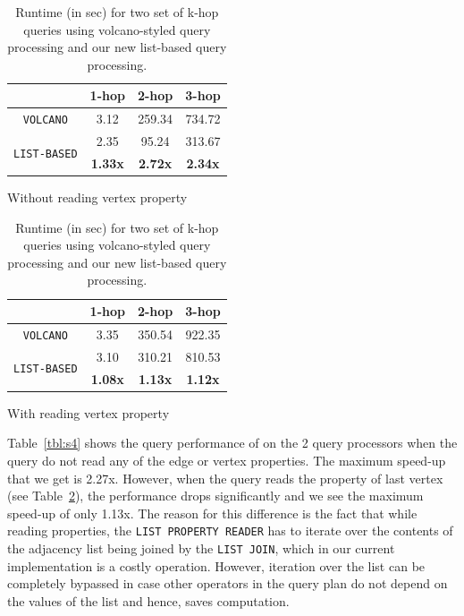\begin{table}
	\centering
	\begin{subtable}{1\textwidth}
		\centering
		\bgroup
		\setlength{\tabcolsep}{8pt}
		\def\arraystretch{1.2}%
		\begin{tabular}{ |c|c|c|c| }
			\hline
			& \textbf{1-hop} & \textbf{2-hop} & \textbf{3-hop} \\ 
			\hline \hline
			\texttt{VOLCANO}& 3.12 & 259.34 & 734.72 \\ 
			\hline
			\multirow{2}{*}{\texttt{LIST-BASED}}& 2.35 & 95.24 & 313.67 \\ 
			& \textbf{1.33x} & \textbf{2.72x} & \textbf{2.34x} \\ 
			\hline
		\end{tabular}
		\egroup
		\captionsetup{justification=centering}
		\caption{Without reading vertex property}
		\label{tbl:s4}
	\end{subtable}
	\begin{subtable}{1\textwidth}
		\centering
		\bgroup
		\setlength{\tabcolsep}{8pt}
		\def\arraystretch{1.2}
		\begin{tabular}{ |c|c|c|c| }
			\hline
			& \textbf{1-hop} & \textbf{2-hop} & \textbf{3-hop} \\ 
			\hline \hline
			\texttt{VOLCANO}& 3.35 & 350.54 & 922.35 \\ 
			\hline
			\multirow{2}{*}{\texttt{LIST-BASED}}& 3.10 & 310.21 & 810.53 \\ 
			& \textbf{1.08x} & \textbf{1.13x} & \textbf{1.12x} \\ 
			\hline
		\end{tabular}
		\egroup
		\captionsetup{justification=centering}
		\caption{With reading vertex property}
		\label{tbl:s5}
	\end{subtable}
	\captionsetup{justification=centering}
	\caption{Runtime (in sec) for two set of k-hop queries using volcano-styled query processing and our new list-based query processing.  }
\end{table}

Table~\ref{tbl:s4} shows the query performance of on the 2 query processors when the query do not read any of the edge or vertex properties. The maximum speed-up that we get is 2.27x. However, when the query reads the property of last vertex (see Table~\ref{tbl:s5}), the performance drops significantly and we see the maximum speed-up of only 1.13x. The reason for this difference is the fact that while reading properties, the \texttt{LIST PROPERTY READER} has to iterate over the contents of the adjacency list being joined by the \texttt{LIST JOIN}, which in our current implementation is a costly operation. However, iteration over the list can be completely bypassed in case other operators in the query plan do not depend on the values of the list and hence, saves computation. 

















